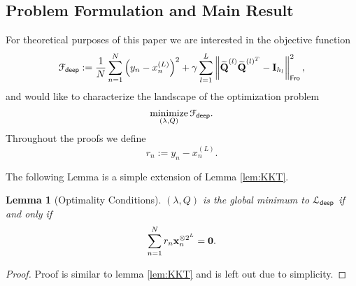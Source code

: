 \documentclass[11pt]{article}
\theoremstyle{plain}
\newtheorem{lemma}{Lemma}
\DeclareMathOperator*{\minimize}{minimize}
\theoremstyle{plain}
\numberwithin{equation}{section}
\numberwithin{lemma}{section}
\numberwithin{theorem}{section}
\numberwithin{corollary}{section}
\numberwithin{observation}{section}
\numberwithin{definition}{section}
\numberwithin{example}{section}
\begin{document}
\subsection{Problem Formulation and Main Result}
For theoretical purposes of this paper we are interested in the objective function
\begin{equation}
    \mathcal{F}_{\sf{deep}}:= \frac{1}{N}\sum_{n=1}^N \left( {y}_n - {x}_n^{(L)}\right)^2 + \gamma \sum_{l=1}^{L} \left\|  \widetilde{\Mx{Q}}^{(l)}\widetilde{\Mx{Q}}^{(l)^T}-\Mx{I}_{h_l}\right\|_{\sf Fro}^2,
\end{equation}
and would like to characterize the landscape of the optimization problem
\begin{equation} \label{eq:deep_objective}
    \minimize_{ \left(\lambda, Q \right)} \mathcal{F}_{\sf{deep}}.
\end{equation}
Throughout the proofs we define
\[
{r}_n := {y}_n - {x}_n^{(L)}.
\]

\noindent The following Lemma is a simple extension of Lemma \ref{lem:KKT}.
\begin{lemma}[Optimality Conditions]
$(\lambda,Q)$ is the global minimum to $\mathcal{L}_{\sf deep}$ if and only if
\begin{equation}
\sum_{n=1}^N r_n {\V{x}_n^{\otimes 2^L}} = \Mx{0}.
\end{equation}
\end{lemma}
\begin{proof}
Proof is similar to lemma \ref{lem:KKT} and is left out due to simplicity.
\end{proof}
\end{document}
